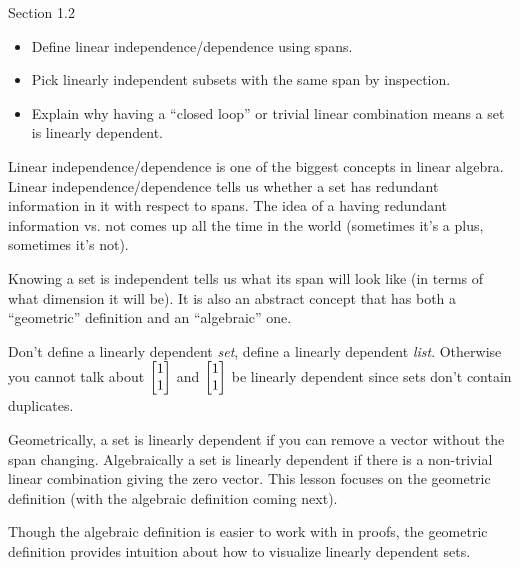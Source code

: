 \begin{lesson}

	Section 1.2

	\begin{itemize}
		\item Define linear independence/dependence using spans.
		\item Pick linearly independent subsets with the same span by inspection.
		\item Explain why having a ``closed loop'' or trivial linear combination
			means a set is linearly dependent.
	\end{itemize}

	Linear independence/dependence is one of the biggest concepts in linear algebra.
	Linear independence/dependence tells us whether a set has redundant information
	in it with respect to spans. The idea of a having redundant information vs\mbox{.}
	not comes up all the time in the world (sometimes it's a plus, sometimes it's not).

	Knowing
	a set is independent tells us what its span will look like (in terms of what dimension
	it will be). It is also an abstract concept that has both a ``geometric'' definition
	and an ``algebraic'' one.
	\begin{annotation}
		\begin{notes}
			Don't define a linearly dependent \emph{set}, define
			a linearly dependent \emph{list}. Otherwise you cannot talk about
			$\mat{1\\1}$ and $\mat{1\\1}$ be linearly dependent since sets don't
			contain duplicates.
		\end{notes}
	\end{annotation}
	Geometrically, a set is linearly dependent if you can remove
	a vector without the span changing. Algebraically a set is linearly dependent if there
	is a non-trivial linear combination giving the zero vector. This lesson focuses on the
	geometric definition (with the algebraic definition coming next).

	Though the algebraic definition is easier to work with in proofs, the geometric definition
	provides intuition about how to visualize linearly
	dependent sets.

\end{lesson}

